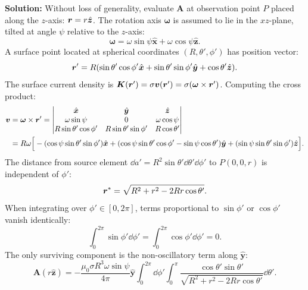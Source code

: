 \begin{example}
    \textbf{Solution:}
    Without loss of generality, evaluate $\bm{A}$ at observation point $P$ placed along the $z$-axis: $\bm{r} = r \hat{\bm{z}}$. The rotation axis $\bm{\omega}$ is assumed to lie in the $xz$-plane, tilted at angle $\psi$ relative to the $z$-axis:
    \begin{equation}
        \bm{\omega} = \omega \sin\psi \hat{\bm{x}} + \omega \cos\psi \hat{\bm{z}}.
    \end{equation}
    A surface point located at spherical coordinates $(R, \theta', \phi')$ has position vector:
    \begin{equation}
        \bm{r}' = R(\sin\theta'\cos\phi' \hat{\bm{x}} + \sin\theta'\sin\phi' \hat{\bm{y}} + \cos\theta' \hat{\bm{z}}).
    \end{equation}
    The surface current density is $\bm{K}(\bm{r}') = \sigma \bm{v}(\bm{r}') = \sigma (\bm{\omega} \times \bm{r}')$. Computing the cross product:
    \begin{align}
        \bm{v} &= \bm{\omega}\times \bm{r}' = \begin{vmatrix}
            \hat{\bm{x}} & \hat{\bm{y}} & \hat{\bm{z}} \\
            \omega\sin\psi & 0 & \omega\cos\psi \\
            R\sin\theta'\cos\phi' & R\sin\theta'\sin\phi' & R\cos\theta'
        \end{vmatrix} \nonumber \\
        &= R\omega \Big[ -(\cos\psi\sin\theta'\sin\phi')\hat{\bm{x}} + (\cos\psi\sin\theta'\cos\phi' - \sin\psi\cos\theta')\hat{\bm{y}} + (\sin\psi\sin\theta'\sin\phi')\hat{\bm{z}} \Big].
    \end{align}
    The distance from source element $\dd{a'} = R^2 \sin\theta' \dd{\theta'} \dd{\phi'}$ to $P(0,0,r)$ is independent of $\phi'$:
    \begin{equation}
        \bm{r}^* = \sqrt{R^2 + r^2 - 2 R r \cos\theta'}.
    \end{equation}
    When integrating over $\phi' \in [0, 2\pi]$, terms proportional to $\sin\phi'$ or $\cos\phi'$ vanish identically:
    \begin{equation}
        \int_0^{2\pi} \sin\phi'\dd{\phi'} = \int_0^{2\pi} \cos\phi'\dd{\phi'} = 0.
    \end{equation}
    The only surviving component is the non-oscillatory term along $\hat{\bm{y}}$:
    \begin{equation}
        \bm{A}(r\hat{\bm{z}}) = -\frac{\mu_0 \sigma R^3 \omega \sin\psi}{4\pi} \hat{\bm{y}} \int_0^{2\pi}\dd{\phi'} \int_0^\pi \frac{\cos\theta'\sin\theta'}{\sqrt{R^2 + r^2 - 2Rr\cos\theta'}} \dd{\theta'}.

\end{equation}
\end{example}
